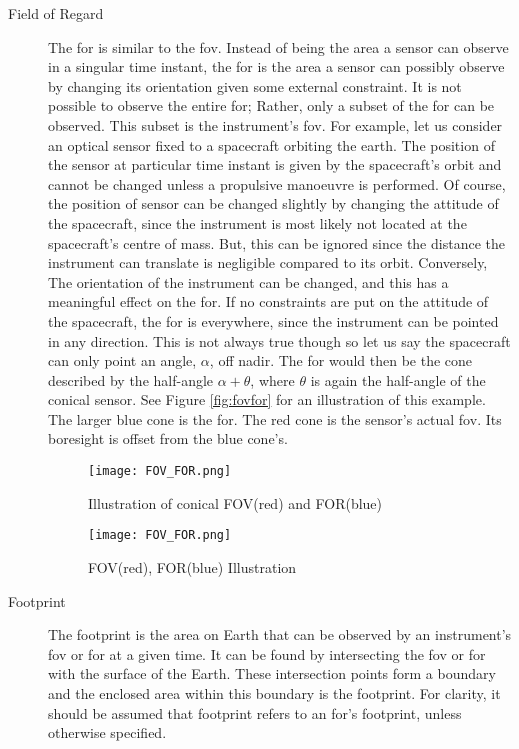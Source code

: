 \begin{description}
    \item[Field of Regard] The \gls{for} is similar to the \gls{fov}. Instead
	of being the area a sensor can observe in a singular time instant, the
	\gls{for} is the area a sensor can possibly observe by changing its
	orientation given some external constraint. It is not possible to
	observe the entire \gls{for}; Rather, only a subset of the \gls{for}
	can be observed. This subset is the instrument's \gls{fov}.  For
	example, let us consider an optical sensor fixed to a spacecraft
	orbiting the earth. The position of the sensor at particular time
	instant is given by the spacecraft's orbit and cannot be changed unless
	a propulsive manoeuvre is performed. Of course, the position of sensor
	can be changed slightly by changing the attitude of the spacecraft,
	since the instrument is most likely not located at the spacecraft's
	centre of mass. But, this can be ignored since the distance the
	instrument can translate is negligible compared to its orbit.
	Conversely, The orientation of the instrument can be changed, and this
	has a meaningful effect on the \gls{for}. If no constraints are put on
	the attitude of the spacecraft, the \gls{for} is everywhere, since the
	instrument can be pointed in any direction. This is not always true
	though so let us say the spacecraft can only point an angle, $\alpha$,
	off nadir.  The \gls{for} would then be the cone described by the
	half-angle $\alpha + \theta$, where $\theta$ is again the half-angle of
	the conical sensor.  See Figure \ref{fig:fovfor} for an illustration of
	this example.  The larger blue cone is the \gls{for}. The red cone is
	the sensor's actual \gls{fov}. Its boresight is offset from the blue
	cone's.


\begin{figure} 
    \centering
    \begin{minipage}[c]{0.45\textwidth}
	\centering
	\texttt{[image: FOV\_FOR.png]} \caption{Illustration of conical 
	FOV(red) and FOR(blue)}
	\label{fig:fovfor} 
    \end{minipage}
    \hfill
    \begin{minipage}[c]{0.45\textwidth}
	\centering
	\texttt{[image: FOV\_FOR.png]} \caption{FOV(red),
	FOR(blue) Illustration}
	\label{fig:fovfor2} 
    \end{minipage} 
\end{figure}

    \item[Footprint] The footprint is the area on Earth that can be observed by
	an instrument's \gls{fov} or \gls{for} at a given time. It can be found
	by intersecting the \gls{fov} or \gls{for} with the surface of the
	Earth.  These intersection points form a boundary and the enclosed area
	within this boundary is the footprint. For clarity, it should be
	assumed that footprint refers to an \gls{for}'s footprint, unless
	otherwise specified.


\end{description}
